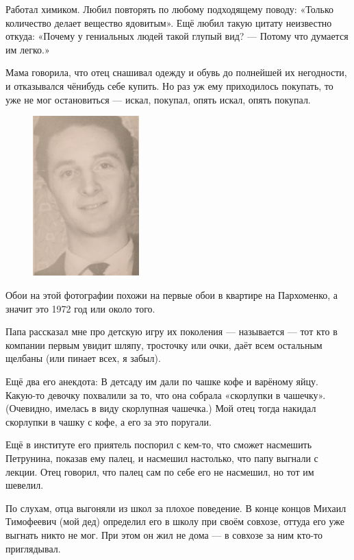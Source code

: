 \documentclass{book}
\begin{document}
Работал химиком.
Любил повторять по любому подходящему поводу: «Только количество делает вещество ядовитым».
Ещё любил такую цитату неизвестно откуда:
«Почему у гениальных людей такой глупый вид? --- Потому что думается им легко.»

Мама говорила, что отец снашивал одежду и обувь до полнейшей их негодности, и отказывался чёнибудь себе купить.
Но раз уж ему приходилось покупать, то уже не мог остановиться --- искал, покупал, опять искал, опять покупал.

\begin{figure}
\vskip-4mm
\centering
\includegraphics[width=41mm,angle=0]{pics/papa}
\end{figure}

Обои на этой фотографии похожи на первые обои в квартире на Пархоменко, а значит это 1972 год или около того.

Папа рассказал мне про детскую игру их поколения --- называется  --- тот кто в компании первым увидит шляпу, тросточку или очки, даёт всем остальным щелбаны (или пинает всех, я забыл).

Ещё два его анекдота:
В детсаду им дали по чашке кофе и варёному яйцу.
Какую-то девочку похвалили за то, что она собрала «скорлупки в чашечку».
(Очевидно, имелась в виду скорлупная чашечка.)
Мой отец тогда накидал скорлупки в чашку с кофе, а его за это поругали.

Ещё в институте его приятель поспорил с кем-то, что сможет насмешить Петрунина, показав ему палец, и насмешил настолько, что папу выгнали с лекции.
Отец говорил, что палец сам по себе его не насмешил, но тот им шевелил.

По слухам, отца выгоняли из школ за плохое поведение.
В конце концов Михаил Тимофеевич (мой дед) определил его в школу при своём совхозе, оттуда его уже выгнать никто не мог.
При этом он жил не дома --- в совхозе за ним кто-то приглядывал.
\end{document}
